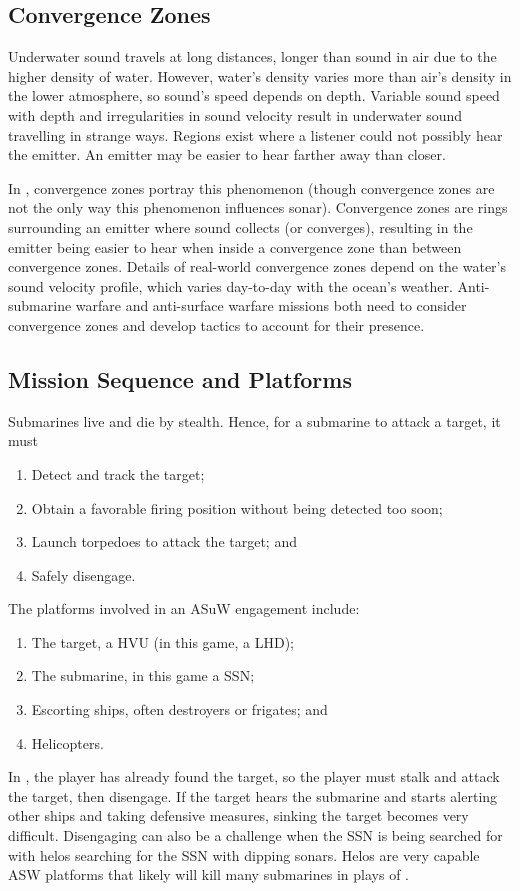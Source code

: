 \documentclass[../TacSubGameRules.tex]{subfiles}
\begin{document}
\subsection*{Convergence Zones}%
\label{sub:convergence_zones}

Underwater sound travels at long distances, longer than sound in air due to the higher density of water.
However, water's density varies more than air's density in the lower atmosphere, so sound's speed depends on depth.
Variable sound speed with depth and irregularities in sound velocity result in underwater sound travelling in strange ways.
Regions exist where a listener could not possibly hear the emitter.
An emitter may be easier to hear farther away than closer.

In \gametitle, convergence zones portray this phenomenon (though convergence zones are not the only way this phenomenon influences sonar).
Convergence zones are rings surrounding an emitter where sound collects (or converges), resulting in the emitter being easier to hear when inside a convergence zone than between convergence zones.
Details of real-world convergence zones depend on the water's sound velocity profile, which varies day-to-day with the ocean's weather.
Anti-submarine warfare and anti-surface warfare missions both need to consider convergence zones and develop tactics to account for their presence.

\subsection*{Mission Sequence and Platforms}%
\label{sub:attack_sequence}

Submarines live and die by stealth.
Hence, for a submarine to attack a target, it must
\begin{enumerate}
    \item Detect and track the target;
    \item Obtain a favorable firing position without being detected too soon;
    \item Launch torpedoes to attack the target; and
    \item Safely disengage.
\end{enumerate}
The platforms involved in an ASuW engagement include:
\begin{enumerate}
    \item The target, a HVU (in this game, a LHD);
    \item The submarine, in this game a SSN;
    \item Escorting ships, often destroyers or frigates; and
    \item Helicopters.
\end{enumerate}
In \gametitle, the player has already found the target, so the player must stalk and attack the target, then disengage.
If the target hears the submarine and starts alerting other ships and taking defensive measures, sinking the target becomes very difficult.
Disengaging can also be a challenge when the SSN is being searched for with helos searching for the SSN with dipping sonars.
Helos are very capable ASW platforms that likely will kill many submarines in plays of \gametitle.
\end{document}
